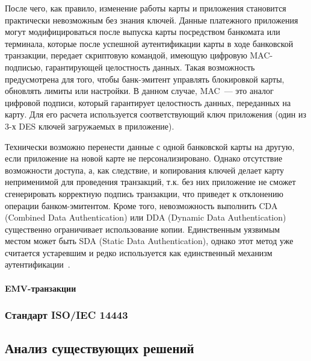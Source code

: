 После чего, как правило, изменение работы карты и приложения становится практически невозможным без знания ключей.
Данные платежного приложения могут модифицироваться после выпуска карты посредством банкомата или терминала, которые после успешной аутентификации карты в ходе банковской транзакции, передает скриптовую командой, имеющую цифровую MAC-подписью, гарантирующей целостность данных.
Такая возможность предусмотрена для того, чтобы  банк-эмитент управлять блокировкой карты, обновлять лимиты или настройки.
В данном случае, MAC~--- это аналог цифровой подписи, который гарантирует целостность данных, переданных на карту. 
Для его расчета используется соответствующий ключ приложения (один из 3-х DES ключей загружаемых в приложение).

Технически возможно перенести данные с одной банковской карты на другую, если приложение на новой карте не персонализировано.
Однако отсутствие возможности доступа, а, как следствие, и копирования ключей делает карту неприменимой для проведения транзакций, т.к. без них приложение не сможет сгенерировать корректную подпись транзакции, что приведет к отклонению операции банком-эмитентом.
Кроме того, невозможность выполнить CDA (Combined Data Authentication) или DDA (Dynamic Data Authentication) существенно ограничивает использование копии.
Единственным уязвимым местом может быть SDA (Static Data Authentication), однако этот метод уже считается устаревшим и редко используется как единственный механизм аутентификации~\cite{emv_card_mechanism}.


\paragraph{EMV-транзакции}
\label{par:emv_transaction}





\subsubsection{Стандарт ISO/IEC 14443}



\subsection{Анализ существующих решений}

